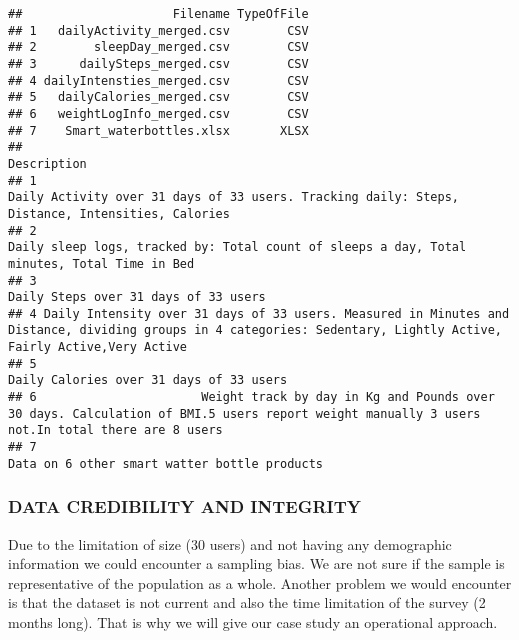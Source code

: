 \documentclass[
]{article}
\begin{document}
\begin{verbatim}
##                     Filename TypeOfFile
## 1   dailyActivity_merged.csv        CSV
## 2        sleepDay_merged.csv        CSV
## 3      dailySteps_merged.csv        CSV
## 4 dailyIntensties_merged.csv        CSV
## 5   dailyCalories_merged.csv        CSV
## 6   weightLogInfo_merged.csv        CSV
## 7    Smart_waterbottles.xlsx       XLSX
##                                                                                                                                                         Description
## 1                                                                   Daily Activity over 31 days of 33 users. Tracking daily: Steps, Distance, Intensities, Calories
## 2                                                                       Daily sleep logs, tracked by: Total count of sleeps a day, Total minutes, Total Time in Bed
## 3                                                                                                                              Daily Steps over 31 days of 33 users
## 4 Daily Intensity over 31 days of 33 users. Measured in Minutes and Distance, dividing groups in 4 categories: Sedentary, Lightly Active, Fairly Active,Very Active
## 5                                                                                                                           Daily Calories over 31 days of 33 users
## 6                       Weight track by day in Kg and Pounds over 30 days. Calculation of BMI.5 users report weight manually 3 users not.In total there are 8 users
## 7                                                                                                                      Data on 6 other smart watter bottle products
\end{verbatim}

\hypertarget{data-credibility-and-integrity}{%
\subsubsection{DATA CREDIBILITY AND
INTEGRITY}\label{data-credibility-and-integrity}}

Due to the limitation of size (30 users) and not having any demographic
information we could encounter a sampling bias. We are not sure if the
sample is representative of the population as a whole. Another problem
we would encounter is that the dataset is not current and also the time
limitation of the survey (2 months long). That is why we will give our
case study an operational approach.
\end{document}
